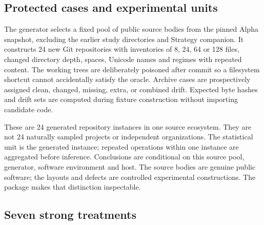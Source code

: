 \documentclass[11pt,a4paper]{article}
\begin{document}
\subsection{Protected cases and experimental units}

The generator selects a fixed pool of public source bodies from the pinned Alpha snapshot, excluding the earlier study directories and Strategy companion. It constructs 24 new Git repositories with inventories of 8, 24, 64 or 128 files, changed directory depth, spaces, Unicode names and regimes with repeated content. The working trees are deliberately poisoned after commit so a filesystem shortcut cannot accidentally satisfy the oracle. Archive cases are prospectively assigned clean, changed, missing, extra, or combined drift. Expected byte hashes and drift sets are computed during fixture construction without importing candidate code.

These are 24 generated repository instances in one source ecosystem. They are not 24 naturally sampled projects or independent organizations. The statistical unit is the generated instance; repeated operations within one instance are aggregated before inference. Conclusions are conditional on this source pool, generator, software environment and host. The source bodies are genuine public software; the layouts and defects are controlled experimental constructions. The package makes that distinction inspectable.

\subsection{Seven strong treatments}
\end{document}
